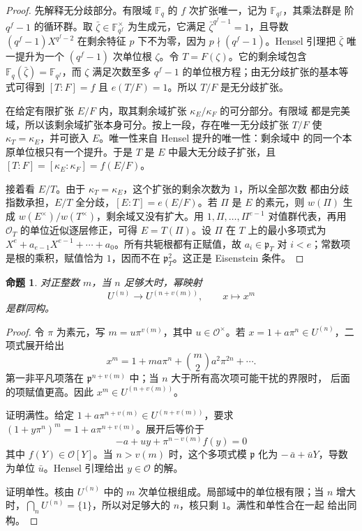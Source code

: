 \documentclass[11pt,a4paper,openany]{ctexbook}
\numberwithin{equation}{chapter}
\newcommand{\F}{\mathbb{F}}
\theoremstyle{plain}
\newtheorem{proposition}[theorem]{命题}
\theoremstyle{definition}
\theoremstyle{remark}
\begin{document}
\begin{proof}
先解释无分歧部分。有限域 $\F_q$ 的 $f$ 次扩张唯一，记为 $\F_{q^f}$，其乘法群是
阶 $q^f-1$ 的循环群。取 $\bar\zeta\in\F_{q^f}^\times$ 为生成元，它满足
$\bar\zeta^{q^f-1}=1$，且导数 $(q^f-1)X^{q^f-2}$ 在剩余特征 $p$ 下不为零，因为
$p\nmid(q^f-1)$。Hensel 引理把 $\bar\zeta$ 唯一提升为一个 $(q^f-1)$ 次单位根
$\zeta$。令 $T=F(\zeta)$。它的剩余域包含 $\F_q(\bar\zeta)=\F_{q^f}$，而
$\zeta$ 满足次数至多 $q^f-1$ 的单位根方程；由无分歧扩张的基本等式可得到
$[T:F]=f$ 且 $e(T/F)=1$。所以 $T/F$ 是无分歧扩张。

在给定有限扩张 $E/F$ 内，取其剩余域扩张 $\kappa_E/\kappa_F$ 的可分部分。有限域
都是完美域，所以该剩余域扩张本身可分。按上一段，存在唯一无分歧扩张 $T/F$
使 $\kappa_T=\kappa_E$，并可嵌入 $E$。唯一性来自 Hensel 提升的唯一性：剩余域中
的同一个本原单位根只有一个提升。于是 $T$ 是 $E$ 中最大无分歧子扩张，且
$[T:F]=[\kappa_E:\kappa_F]=f(E/F)$。

接着看 $E/T$。由于 $\kappa_T=\kappa_E$，这个扩张的剩余次数为 $1$，所以全部次数
都由分歧指数承担，$E/T$ 全分歧，$[E:T]=e(E/F)$。若 $\Pi$ 是 $E$ 的素元，则
$w(\Pi)$ 生成 $w(E^\times)/w(T^\times)$，剩余域又没有扩大。用
$1,\Pi,\dots,\Pi^{e-1}$ 对值群代表，再用 $\mathcal O_T$ 的单位近似逐层修正，可得
$E=T(\Pi)$。设 $\Pi$ 在 $T$ 上的最小多项式为
$X^e+a_{e-1}X^{e-1}+\cdots+a_0$。所有共轭根都有正赋值，故 $a_i\in\mathfrak p_T$
对 $i<e$；常数项是根的乘积，赋值恰为 $1$，因而不在 $\mathfrak p_T^2$。这正是
Eisenstein 条件。
\end{proof}

\begin{proposition}
对正整数 $m$，当 $n$ 足够大时，幂映射
\[
U^{(n)}\longrightarrow U^{(n+v(m))},\qquad x\longmapsto x^m
\]
是群同构。
\end{proposition}

\begin{proof}
令 $\pi$ 为素元，写 $m=u\pi^{v(m)}$，其中 $u\in\mathcal O^\times$。若
$x=1+a\pi^n\in U^{(n)}$，二项式展开给出
\[
x^m=1+ma\pi^n+\binom m2a^2\pi^{2n}+\cdots.
\]
第一非平凡项落在 $\mathfrak p^{n+v(m)}$ 中；当 $n$ 大于所有高次项可能干扰的界限时，
后面的项赋值更高。因此 $x^m\in U^{(n+v(m))}$。

证明满性。给定 $1+a\pi^{n+v(m)}\in U^{(n+v(m))}$，要求
$(1+y\pi^n)^m=1+a\pi^{n+v(m)}$。展开后等价于
\[
-a+uy+\pi^{n-v(m)}f(y)=0
\]
其中 $f(Y)\in\mathcal O[Y]$。当 $n>v(m)$ 时，这个多项式模 $\mathfrak p$ 化为
$-\,\bar a+\bar uY$，导数为单位 $\bar u$。Hensel 引理给出 $y\in\mathcal O$ 的解。

证明单性。核由 $U^{(n)}$ 中的 $m$ 次单位根组成。局部域中的单位根有限；当 $n$
增大时，$\bigcap_nU^{(n)}=\{1\}$，所以对足够大的 $n$，核只剩 $1$。满性和单性合在一起
给出同构。
\end{proof}
\end{document}
